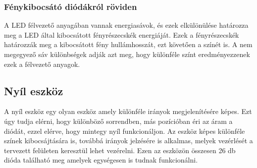 \documentclass[tocnopagenum]{thesis-ekf}
\theoremstyle{definition}
\theoremstyle{remark}
\begin{document}
	\subsubsection{Fénykibocsátó diódákról röviden}
	A LED félvezető anyagában vannak energiasávok, és ezek elkülönülése határozza meg a LED által kibocsátott fényrészecskék energiáját.
	Ezek a fényrészecskék határozzák meg a kibocsátott fény hullámhosszát, ezt követően a színét is. A nem megegyező sáv különbségek adják azt meg, hogy különféle színt eredményezzenek ezek a félvezető anyagok.\cite{leds_magazi}
	\subsection{Nyíl eszköz}
	A nyíl eszköz egy olyan eszköz amely különféle irányok megjelenítésére képes. Ezt úgy tudja elérni, hogy különböző sorrendben, más pozícióban éri az áram a diódát, ezzel elérve, hogy mintegy nyíl funkcionáljon.
	Az eszköz képes különféle színek kibocsájtására is, továbbá irányok jelzésére is alkalmas, melyek vezérlését a tervezett felületen keresztül lehet vezérelni. 
	Ezen az eszközön összesen 26 db dióda található meg amelyek egységesen is tudnak funkcionálni.	
\end{document}
